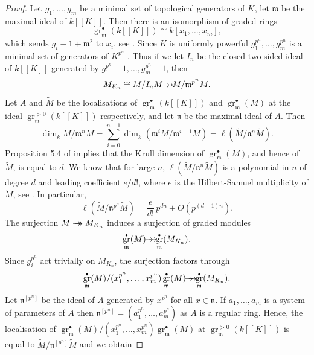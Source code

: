 \documentclass[JEP,XML,SOM,Unicode,NoEqCountersInSection]{cedram}
\newcommand{\onto}{\mathchoice{\to\hspace*{-5mm}\to}{\to\hspace*{-2.85mm}\to}{\to\hspace*{-3mm}\to}{\to\hspace*{-3mm}\to}}
\newcommand{\sbullet}{{\scriptscriptstyle\bullet}}
\theoremstyle{definition}
\DeclareMathOperator{\gr}{gr}
\newcommand{\br}[1]{[\![#1]\!]}
\newcommand{\mm}{\mathfrak m}
\newcommand{\nn}{\mathfrak n}
\begin{document}
\begin{proof} Let $g_1, \ldots, g_m$ be a minimal set of topological generators of $K$, let $\mm$ be the maximal ideal of $k\br{K}$. Then there is an isomorphism of graded rings
\[
\gr^{\sbullet}_{\mm} (k\br{K})\cong k[x_1, \ldots, x_m],
\]
which sends $g_i-1 +\mm^2$ to $x_i$, see \cite[Th.\,3.4]{ardakov_brown}. Since $K$ is uniformly powerful $g_1^{p^n}, \ldots, g_m^{p^n}$ is a minimal set of generators of $K^{p^n}$
\cite[Th.\,3.6\,(iii)]{analytic}. Thus if we let $I_n$ be the closed two-sided ideal of $k\br{K}$ generated by $g_1^{p^n}-1, \ldots, g_m^{p^n}-1$, then
\begin{equation}\label{du}
M_{K_n}\cong M/I_n M \onto M/\mm^{p^n} M.
\end{equation}
Let $A$ and $\widetilde{M}$ be the localisations of $ \gr^{\sbullet}_{\mm} (k\br{K})$ and $\gr^{\sbullet}_{\mm}(M)$
at the ideal $\gr^{>0}_{\mm} (k\br{K})$ respectively, and let $\nn$ be the maximal ideal of $A$. Then
\begin{equation}\label{trys}
\dim_ k M/\mm^n M=\sum_{i=0}^{n-1} \dim_k (\mm^i M/\mm^{i+1} M)= \ell(\widetilde{M}/\nn^n \widetilde{M}).
\end{equation}
Proposition 5.4 of \cite{ardakov_brown} implies that the Krull dimension of $\gr^{\sbullet}_{\mm}(M)$, and hence of $\widetilde{M}$, is equal to $d$. We know
that for large $n$, $\ell(\widetilde{M}/\nn^n \widetilde{M})$ is a polynomial in $n$ of degree $d$ and leading coefficient $e/d!$, where $e$ is the Hilbert-Samuel multiplicity
of $\widetilde{M}$, see \cite[\S14]{matsumura}. In particular,
\begin{equation}\label{keturi}
\ell(\widetilde{M}/\nn^{p^n} \widetilde{M}) = \frac{e}{d!}\, p^{dn} + O(p^{(d-1)n}).
\end{equation}
The surjection $M \onto M_{K_n}$ induces a surjection of graded modules
\[
\gr^{\sbullet}_{\mm}(M)\onto \gr^{\sbullet}_{\mm}(M_{K_n}).
\]
Since $g_i^{p^n}$ act trivially on $M_{K_n}$, the
surjection factors through
\begin{equation}\label{penki}
\gr^{\sbullet}_{\mm}(M)/(x_1^{p^n}, \ldots, x_m^{p^n})\gr^{\sbullet}_{\mm}(M) \onto \gr^{\sbullet}_{\mm}(M_{K_n}).
\end{equation}
Let $\nn^{[p^n]}$ be the ideal of $A$ generated by $x^{p^n}$ for all $x\in \nn$. If $a_1, \ldots, a_m$ is a system of parameters of $A$ then $\nn^{[p^n]}=(a_1^{p^n}, \ldots, a_m^{p^n})$ as $A$ is a regular ring.
Hence, the localisation of $\gr^{\sbullet}_{\mm}(M)/(x_1^{p^n}, \ldots, x_m^{p^n})\gr^{\sbullet}_{\mm}(M)$ at $ \gr^{>0}_{\mm} (k\br{K})$ is equal to $\widetilde{M}/\nn^{[p^n]} \widetilde{M}$ and we obtain

\end{proof}
\end{document}
